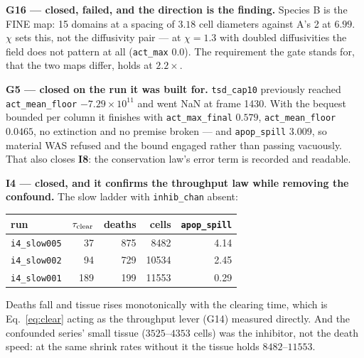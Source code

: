 \documentclass[10pt,a4paper]{article}
\newcommand{\code}[1]{\texttt{#1}}
\newcommand{\op}[1]{\texttt{#1}}
\begin{document}
\textbf{G16 --- closed, failed, and the direction is the finding.} Species B is the FINE map:
15 domains at a spacing of $3.18$ cell diameters against A's 2 at $6.99$. $\chi$ sets this, not the
diffusivity pair --- at $\chi=1.3$ with doubled diffusivities the field does not pattern at all
(\code{act\_max} $0.0$). The requirement the gate stands for, that the two maps differ, holds at
$2.2\times$.

\textbf{G5 --- closed on the run it was built for.} \op{tsd\_cap10} previously reached
\code{act\_mean\_floor} $-7.29\times10^{11}$ and went NaN at frame 1430. With the bequest bounded
per column it finishes with \code{act\_max\_final} $0.579$, \code{act\_mean\_floor} $0.0465$, no
extinction and no premise broken --- and \code{apop\_spill} $3.009$, so material WAS refused and the
bound engaged rather than passing vacuously. That also closes \textbf{I8}: the conservation law's
error term is recorded and readable.

\textbf{I4 --- closed, and it confirms the throughput law while removing the confound.} The slow
ladder with \code{inhib\_chan} absent:

\smallskip
{\small\begin{tabular}{@{}lrrrr@{}}\toprule
run & $\tau_{\rm clear}$ & deaths & cells & \code{apop\_spill}\\\midrule
\op{i4\_slow005} & 37  & 875 &  8482 & 4.14\\
\op{i4\_slow002} & 94  & 729 & 10534 & 2.45\\
\op{i4\_slow001} & 189 & 199 & 11553 & 0.29\\
\bottomrule\end{tabular}}
\smallskip

Deaths fall and tissue rises monotonically with the clearing time, which is Eq.~\eqref{eq:clear}
acting as the throughput lever (G14) measured directly. And the confounded series' small tissue
($3525$--$4353$ cells) was the inhibitor, not the death speed: at the same shrink rates without it
the tissue holds $8482$--$11553$.
\end{document}
